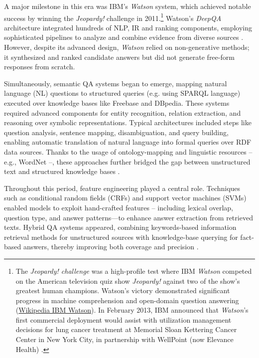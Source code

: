 \begin{spacing}{1.5}
A major milestone in this era was IBM's \textit{Watson} system, which achieved notable success by winning the \textit{Jeopardy!} challenge in 2011.\footnote{The \textit{Jeopardy! challenge} was a high-profile test where IBM \textit{Watson} competed on the American television quiz show \textit{Jeopardy!} against two of the show's greatest human champions. Watson’s victory demonstrated significant progress in machine comprehension and open-domain question answering (\href{https://en.wikipedia.org/w/index.php?title=IBM_Watson&oldid=1301611671}{Wikipedia IBM Watson}). In February 2013, IBM announced that \textit{Watson}'s first commercial deployment would assist with utilization management decisions for lung cancer treatment at Memorial Sloan Kettering Cancer Center in New York City, in partnership with WellPoint (now Elevance Health) \citep{upbin_ibms_2013}.} Watson’s \textit{DeepQA} architecture integrated hundreds of NLP, IR and ranking components, employing sophisticated pipelines to analyze and combine evidence from diverse sources \citep{ferrucci_building_2011}. However, despite its advanced design, \textit{Watson} relied on non-generative methods; it synthesized and ranked candidate answers but did not generate free-form responses from scratch.

Simultaneously, semantic QA systems began to emerge, mapping natural language (NL) questions to structured queries (e.g. using SPARQL language) executed over knowledge bases like Freebase and DBpedia. These systems required advanced components for entity recognition, relation extraction, and reasoning over symbolic representations. Typical architectures included steps like question analysis, sentence mapping, disambiguation, and query building, enabling automatic translation of natural language into formal queries over RDF data sources. Thanks to the usage of ontology-mapping and linguistic resources -- e.g., WordNet --, these approaches further bridged the gap between unstructured text and structured knowledge bases \citep{franco_ontology-based_2020}.

Throughout this period, feature engineering played a central role. Techniques such as conditional random fields (CRFs) and support vector machines (SVMs) enabled models to exploit hand-crafted features -- including lexical overlap, question type, and answer patterns—to enhance answer extraction from retrieved texts. Hybrid QA systems appeared, combining keywords-based information retrieval methods for unstructured sources with knowledge-base querying for fact-based answers, thereby improving both coverage and precision \citep{antoniou_survey_2022}.


\end{spacing}
